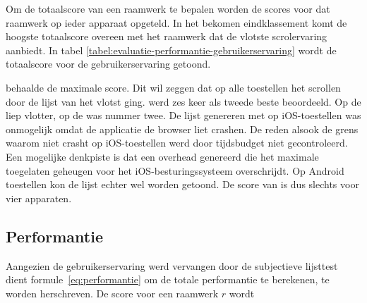 Om de totaalscore van een raamwerk te bepalen worden de scores voor dat raamwerk op ieder apparaat opgeteld.
In het bekomen eindklassement komt de hoogste totaalscore overeen met het raamwerk dat de vlotste scrolervaring aanbiedt. In tabel \ref{tabel:evaluatie-performantie-gebruikerservaring} wordt de totaalscore voor de gebruikerservaring getoond.

\begin{table}[H]
\centering
{}
\caption{Gebruikerservaring voor \st{}~(\sta), \kendo{}~(\kendoa), \jqm{}~(\jqma) en \lungo{}~(\lungoa).}
\label{tabel:evaluatie-performantie-gebruikerservaring}
\end{table}

\st{} behaalde de maximale score.
Dit wil zeggen dat op alle toestellen het scrollen door de lijst van \st{} het vlotst ging.
\jqm{} werd zes keer als tweede beste beoordeeld. 
Op de \htc{} liep \kendo{} vlotter,  op de \ipadi{} was \lungo{} nummer twee.
De lijst genereren met \kendo{} op iOS-toestellen was onmogelijk omdat de applicatie de browser liet crashen.
De reden alsook de grens waarom \kendo{} niet crasht op iOS-toestellen werd door tijdsbudget niet gecontroleerd.
Een mogelijke denkpiste is dat \kendo{} een overhead genereerd die het maximale toegelaten geheugen voor het iOS-besturingssysteem overschrijdt.
Op Android toestellen kon de \kendo{} lijst echter wel worden getoond.
De score van \kendo{} is dus slechts voor vier apparaten.



\subsection{Performantie}
Aangezien de gebruikerservaring werd vervangen door de subjectieve lijsttest dient formule~\ref{eq:performantie} om de totale performantie te berekenen, te worden herschreven.
De score voor een raamwerk $r$ wordt 

